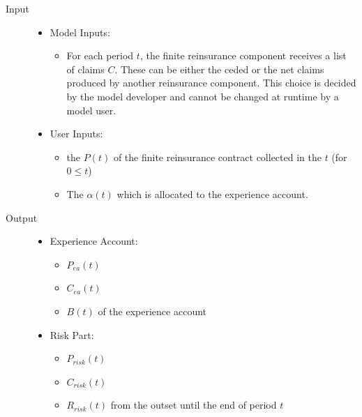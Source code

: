 \begin{description}
	\item[Input] \hfill
		\begin{itemize}%
			\item[] Model Inputs:
			\begin{itemize}%
				\item[] For each period $t$, the finite reinsurance component receives a list of claims $C$. These can be either the ceded or the net claims produced by another reinsurance component. This choice is decided by the model developer and cannot be changed at runtime by a model user.
			\end{itemize}
			\item[] User Inputs:
			\begin{itemize}%
				\item[] the  $P(t)$ of the finite reinsurance contract collected in the  $t$ (for $0 \leq t$)
				\item[] The  $\alpha(t)$ which is allocated to the experience account. 
			\end{itemize}
		\end{itemize}
	\item[Output] \hfill
		\begin{itemize}%
			\item[] Experience Account:
			\begin{itemize}%
				\item[]  $P_{ea}(t)$
				\item[]  $C_{ea}(t)$
				\item[]  $B(t)$ of the experience account
			\end{itemize}
			\item[] Risk Part:
			\begin{itemize}%
				\item[]  $P_{risk}(t)$
				\item[]  $C_{risk}(t)$
				\item[]  $R_{risk}(t)$ from the outset until the end of period $t$
			\end{itemize}

\end{itemize}
\end{description}
